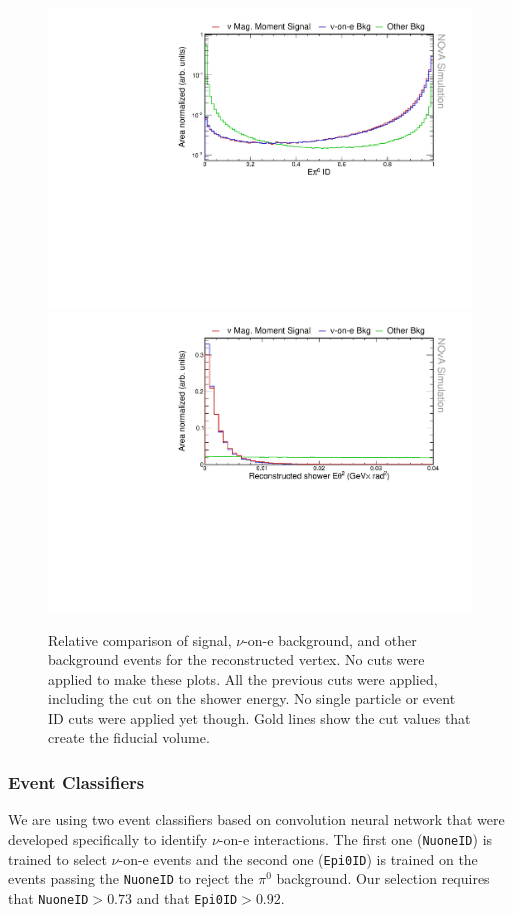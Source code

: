 \begin{figure}[hbtp]
\centering
\includegraphics[width=.9\textwidth]{Plots/NuMMEventSelection/LogY_N1Cut_epi0idPre.pdf}
\includegraphics[width=.9\textwidth]{Plots/NuMMEventSelection/N1Cut_eth2Pre.pdf}
\caption{Relative comparison of signal, $\nu$-on-e background, and other background events for the reconstructed vertex. No cuts were applied to make these plots. All the previous cuts were applied, including the cut on the shower energy. No single particle or event ID cuts were applied yet though. Gold lines show the cut values that create the fiducial volume.}
\label{fig:SingleShowerCuts}
\end{figure}

\subsubsection*{Event Classifiers}

We are using two event classifiers based on convolution neural network that were developed specifically to identify $\nu$-on-e interactions. The first one (\texttt{NuoneID}) is trained to select $\nu$-on-e events and the second one (\texttt{Epi0ID}) is trained on the events passing the \texttt{NuoneID} to reject the $\pi^0$ background. Our selection requires that \texttt{NuoneID}$>0.73$ and that \texttt{Epi0ID}$>0.92$.

